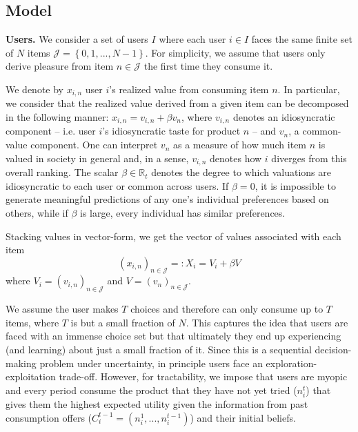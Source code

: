 \documentclass[format=acmsmall, review=false]{acmart}
\newcommand{\xhdr}[1]{\vspace{1mm} \noindent{\bf #1}}
\begin{document}
\subsection{Model}
\par
\noindent \textbf{Users.} We consider a set of users $I$ where each user $i \in I$ faces the same finite set of $N$ items $\mathcal J = \left\{0,1,...,N-1\right\}$. For simplicity, we assume that users only derive pleasure from item $n \in \mathcal{J}$ the first time they consume it.
\par

We denote by $x_{i,n}$ user $i$'s realized value from consuming item $n$. In particular, we consider that the realized value derived from a given item can be decomposed in the following manner: $x_{i,n}= v_{i,n} + \beta v_n$, where $v_{i,n}$ denotes an idiosyncratic component -- i.e. user $i$'s idiosyncratic taste for product $n$ --  and $v_{n}$, a common-value component. One can interpret $v_n$ as a measure of how much item $n$ is valued in society in general and, in a sense, $v_{i,n}$ denotes how $i$ diverges from this overall ranking. The scalar $\beta \in \mathbb{R}_{t}$ denotes the degree to which valuations are idiosyncratic to each user or common across users. If $\beta=0$, it is impossible to generate meaningful predictions of any one's individual preferences based on others, while if $\beta$ is large, every individual has similar preferences.
\par
Stacking values in vector-form, we get the vector of values associated with each item 
$${\left(x_{i,n}\right)}_{n \in \mathcal{J}}=:X_i =V_i+ \beta V $$
where $V_i ={\left(v_{i,n}\right)}_{n \in \mathcal{J}}$ and $V={\left(v_{n}\right)}_{n \in \mathcal{J}}$.
\par
\xhdr{User Decision-Making.}
We assume the user makes $T$ choices and therefore can only consume up to $T$ items, where $T$ is but a small fraction of $N$. This captures the idea that users are faced with an immense choice set but that ultimately they end up experiencing (and learning) about just a small fraction of it. Since this is a sequential decision-making problem under uncertainty, in principle users face an exploration-exploitation trade-off. However, for tractability, we impose that users are myopic and every period consume the product that they have not yet tried ($n_i^t$) that gives them the highest expected utility given the information from past consumption offers ($C_i^{t-1}=(n_i^1,...,n_i^{t-1})$) and their initial beliefs.
\par
\end{document}
